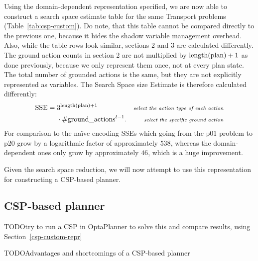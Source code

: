 {Using the domain-dependent representation specified, we are now able to construct
a search space estimate table for the same Transport problems (Table~\ref{tab:csp-custom}).
Do note, that this table cannot be compared directly to the previous one,
because it hides the shadow variable management overhead.
Also, while the table rows look similar, sections 2 and 3 are calculated
differently. The ground action counts in section 2 are not multiplied by $\textrm{length(plan)} + 1$
as done previously, because we only represent them once, not at every plan state.
The total number of grounded actions is the same, but they are not explicitly represented as variables. The Search Space size Estimate is therefore calculated differently:
\begin{align*}
\textrm{SSE} =\; &3^{\textrm{length(plan)} + 1} & \textit{\scriptsize select the action type of each action}\\
&\cdot \textrm{\#ground\_actions}^{l-1}. & \textit{\scriptsize select the specific ground action}
\end{align*}
For comparison to the na{\"{i}}ve encoding SSEs which going from the p01 problem to p20 grow by a logarithmic factor of approximately $538$,
whereas the domain-dependent ones only grow by approximately $46$,
which is a huge improvement.

Given the search space reduction, we will now attempt to use this representation
for constructing a CSP-based planner.

\subsection{CSP-based planner}\label{csp-planner}

TODO{try to run a CSP in OptaPlanner to solve this and compare results, using Section~\ref{csp-custom-repr}}

TODO{Advantages and shortcomings of a CSP-based planner}

}